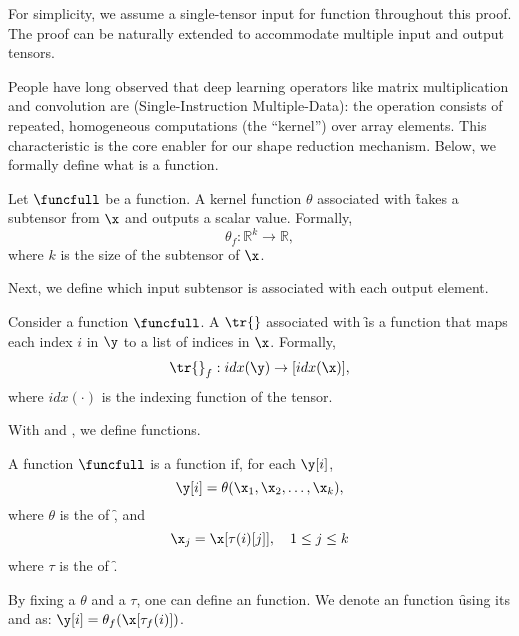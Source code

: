 For simplicity, we assume a single-tensor input for function \f throughout this
proof. The proof can be naturally extended to accommodate multiple input
and output tensors.

People have long observed that deep learning operators like matrix multiplication
and convolution are \simd{} (Single-Instruction Multiple-Data):
the operation consists of repeated, homogeneous computations (the ``kernel'') over array elements.
This \simd{} characteristic is the core enabler for our shape reduction mechanism.
Below, we formally define what is a \simd{} function.

\begin{definition}[\CF{\kfunc}]
Let $\funcfull$ be a function.
A kernel function $\theta$ associated with \f takes a subtensor from $\x$
and outputs a scalar value. Formally,
\[
\theta_f: \mathbb{R}^{k} \to \mathbb{R},
\]
where $k$ is the size of the subtensor of $\x$.
\label{def:kernelfunc}
\end{definition}

Next, we define which input subtensor is associated with each output element.

\begin{definition}[\Depmap]
Consider a function $\funcfull$.
A \depmap $\tr{}$ associated with \f is a function that maps each index $i$ in $\y$
to a list of indices in $\x$. Formally,
\begin{align*}
    \tr{}_f: idx(\y) \to [idx(\x)],
\end{align*}
where $idx(\cdot)$ is the indexing function of the tensor.
\label{def:mapping}
\label{def:depmap}
\end{definition}


With \depmap and \kfunc, we define \simd{} functions.


\begin{definition}
\label{def:simd_func}

A function
$\funcfull$
is a \simd{} function if,
for each $\y[i]$,
\[
\y[i] = \theta(\x_{1}, \x_{2}, \dots, \x_{k}),
\]
where $\theta$ is the \kfunc of \f, and
\[
\x_{j} = \x[ \tau(i)[j] ],\quad 1\le j \le k
\]
where $\tau$ is the \depmap of \f.
\label{def:simdfunc}
\end{definition}


By fixing a \kfunc $\theta$ and a \depmap $\tau$,
one can define an \simd{} function.
We denote an \simd{} function \f using its \kfunc and \depmap as:
$\y[i] = \theta_f(\x[\tau_f(i)])$.





